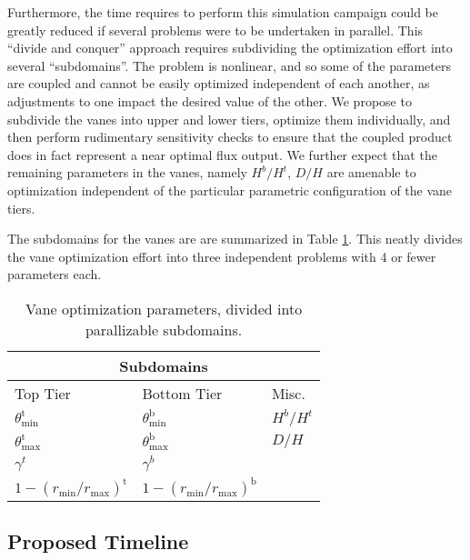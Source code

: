 Furthermore, the time requires to perform this simulation campaign could
be greatly reduced if several problems were to be undertaken in
parallel. This ``divide and conquer'' approach requires subdividing the
optimization effort into several ``subdomains''. 
The problem is nonlinear, and so some of the parameters are coupled and
cannot be easily optimized independent of each another, as adjustments
to one impact the desired value of the other. 
We propose to subdivide the vanes into upper and lower tiers, optimize
them individually, and then perform rudimentary sensitivity checks to
ensure that the coupled product does in fact represent a near optimal
flux output. We further expect that the remaining parameters in the
vanes, namely $H^b/H^t$, $D/H$ are amenable to optimization independent
of the particular parametric configuration of the vane tiers. 

The subdomains for the vanes are are summarized in Table
\ref{tab:opt}. This neatly divides the vane optimization effort into
three independent problems with 4 or fewer parameters each.

\begin{center}
\begin{table}[h]
 \centering
  \begin{tabular}{|l | l | l |}
   \multicolumn{3}{c}{Subdomains} \\
    \hline
   Top Tier & Bottom Tier & Misc. \\
   \hline
   $\theta^{\text{t}}_{\text{min}}$ & $\theta^{\text{b}}_{\text{min}}$ &
       $H^b/H^t$ \\
   $\theta^{\text{t}}_{\text{max}}$ & $\theta^{\text{b}}_{\text{max}}$&
	   $D/H$ \\ 
   $\gamma^t$ & $\gamma^b$ & \\
   $1 - (r_{\text{min}} / r_{\text{max}})^{\text{t}}$ & $1 -
       (r_{\text{min}} / r_{\text{max}})^{\text{b}}$ & \\
   \hline
  \end{tabular}
  \caption{Vane optimization parameters, divided into parallizable
 subdomains.} 
  \label{tab:opt}
\end{table}
\end{center}

\subsection{Proposed Timeline}




